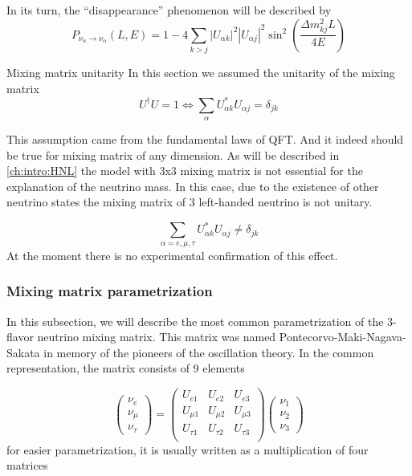 \documentclass[../main.tex]{subfiles}
\begin{document}
In its turn, the ``disappearance'' phenomenon will be described by
\begin{equation}
\label{eq:intro:dis}
P_{\nu_\alpha\to\nu_\alpha}(L, E)=1-4\sum_{k>j}\left|U_{\alpha k}\right|^2\left|U_{\alpha j}\right|^2\sin^2\left(\frac{\Delta m^2_{kj}L}{4E}\right)
\end{equation}

\begin{bclogo}[couleur=blue!2, arrondi=0.1, logo=\bcinfo, nobreak=true]{Mixing matrix unitarity}
In this section we assumed the unitarity of the mixing matrix
\begin{equation}
U^\dag U=1 \Longleftrightarrow\sum_\alpha U^*_{\alpha k}U_{\alpha j}=\delta_{jk}
\end{equation}

This assumption came from the fundamental laws of QFT. And it indeed should be true for mixing matrix of any dimension. As will be described in \autoref{ch:intro:HNL} the model with 3x3 mixing matrix is not essential for the explanation of the neutrino mass. In this case, due to the existence of other neutrino states the mixing matrix of 3 left-handed neutrino is not unitary.

\begin{equation}
\sum_{\alpha=e, \mu, \tau} U^*_{\alpha k}U_{\alpha j}\neq\delta_{jk}
\end{equation}
At the moment there is no experimental confirmation of this effect.
\end{bclogo}

\subsubsection{Mixing matrix parametrization}
In this subsection, we will describe the most common parametrization of the 3-flavor neutrino mixing matrix. This matrix was named Pontecorvo-Maki-Nagava-Sakata in memory of the pioneers of the oscillation theory. In the common representation, the matrix consists of 9 elements

\begin{equation}
\begin{pmatrix}
\nu_e \\ \nu_\mu \\ \nu_\tau
\end{pmatrix}
=
\begin{pmatrix}
U_{e1} & U_{e2} & U_{e3} \\
U_{\mu 1} & U_{\mu 2} & U_{\mu 3} \\
U_{\tau 1} & U_{\tau 2} & U_{\tau 3} \\
\end{pmatrix}
\begin{pmatrix}
\nu_1 \\ \nu_2 \\ \nu_3
\end{pmatrix}
\end{equation}
for easier parametrization, it is usually written as a multiplication of four matrices
\end{document}
